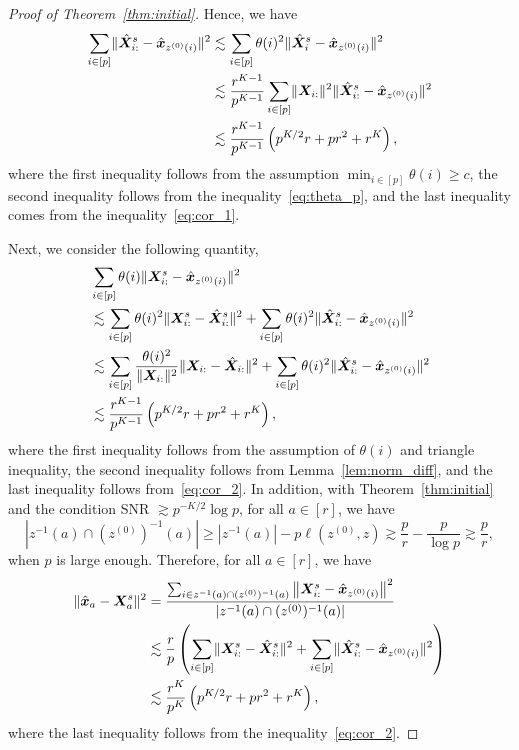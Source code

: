 \documentclass[journal]{IEEEtran}
\theoremstyle{definition}
\theoremstyle{definition}
\newcommand{\of}[1]{\left(#1\right)}
\begin{document}
\begin{proof}[Proof of Theorem~\ref{thm:initial}]
Hence, we have 
\begin{align}
    \sum_{i \in [p]} \onormSize{}{\hat \mX_{i:}^s - \hat \mx_{z^{(0)}(i)}}^2 &\lesssim \sum_{i \in [p]} \theta(i)^2 \onormSize{}{\hat \mX_i^s - \hat \mx_{z^{(0)}(i)}}^2 \\
    &\lesssim \frac{r^{K-1}}{p^{K-1}} \sum_{i \in [p]} \onormSize{}{\mX_{i:}}^2 \onormSize{}{\hat \mX_{i:}^s - \hat \mx_{z^{(0)}(i)}}^2\\
    & \lesssim \frac{r^{K-1}}{p^{K-1}} \of{ p^{K/2}r + pr^2 + r^K },\label{eq:cor_2}
\end{align}
where the first inequality follows from the assumption $\min_{i \in [p]} \theta(i) \geq c$, the second inequality follows from the inequality~\eqref{eq:theta_p}, and the last inequality comes from the inequality~\eqref{eq:cor_1}.

Next, we consider the following quantity,
\begin{align}
    &\sum_{i \in [p]} \theta(i) \onormSize{}{ \mX_{i:}^s - \hat \mx_{z^{(0)}(i)}}^2\\
    &\lesssim \sum_{i \in [p]} \theta(i)^2 \onormSize{}{\mX_{i:}^s - \hat \mX_{i:}^s}^2 + \sum_{i \in [p]} \theta(i)^2 \onormSize{}{\hat \mX_{i:}^s - \hat \mx_{z^{(0)}(i)} }^2\\
    & \lesssim \sum_{i \in [p]} \frac{ \theta(i)^2}{ \onormSize{}{\mX_{i:}}^2} \onormSize{}{\mX_{i:}  - \hat \mX_{i:}}^2 +  \sum_{i \in [p]} \theta(i)^2 \onormSize{}{\hat \mX_{i:}^s - \hat \mx_{z^{(0)}(i)} }^2\\
    & \lesssim \frac{r^{K-1}}{p^{K-1}} \of{ p^{K/2}r + pr^2 + r^K} ,\label{eq:cor_3}
\end{align}
where the first inequality follows from the assumption of $\theta(i)$ and triangle inequality, the second inequality follows from Lemma~\ref{lem:norm_diff}, and the last inequality follows from~\eqref{eq:cor_2}. In addition, with Theorem~\ref{thm:initial} and the condition SNR $\gtrsim p^{-K/2} \log p$, for all $a \in [r]$, we have
\small
\begin{equation}
    |z^{-1}(a) \cap (z^{(0)})^{-1} (a)| \geq |z^{-1}(a)| - p\ell(z^{(0)} ,  z) \gtrsim \frac{p}{r} - \frac{p}{\log p} \gtrsim \frac{p}{r},
\end{equation}
\normalsize
when $p$ is large enough. Therefore, for all $a \in [r]$, we have
\small
\begin{align}
       \onormSize{}{ \hat \mx_{a} - \mX_{a}^s  }^2  &= \frac{ \sum_{i \in z^{-1}(a) \cap (z^{(0)})^{-1} (a) } \onorm{ \mX_{i:}^s - \hat \mx_{z^{(0)}(i)}}^2 }{|z^{-1}(a) \cap (z^{(0)})^{-1} (a) |}  \\
       & \lesssim \frac{r}{p} \of{  \sum_{i \in [p]} \onormSize{}{ \mX_{i:}^s - \hat \mX_{i:}^s }^2 + \sum_{i \in [p]} \onormSize{}{\hat \mX_{i:}^s - \hat \mx_{z^{(0)}(i)}}^2 } \\
       & \lesssim  \frac{r^{K}}{p^{K}}\of{ p^{K/2}r + pr^2 + r^K}, \label{eq:cor_4}
\end{align}
\normalsize
where the last inequality follows from the inequality~\eqref{eq:cor_2}.


\end{proof}
\end{document}
